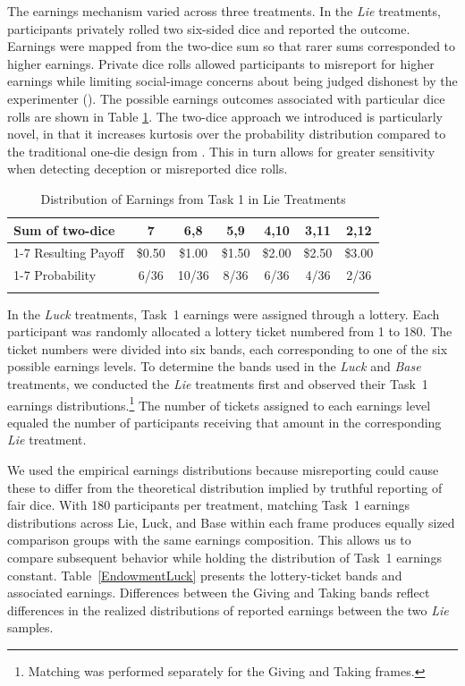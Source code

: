 \documentclass{article}
\begin{document}
The earnings mechanism varied across three treatments. In the \textit{Lie} treatments, participants privately rolled two six-sided dice and reported the outcome. Earnings were mapped from the two-dice sum so that rarer sums corresponded to higher earnings. Private dice rolls allowed participants to misreport for higher earnings while limiting social-image concerns about being judged dishonest by the experimenter (\cite{Fischbacher2013}). The possible earnings outcomes associated with particular dice rolls are shown in Table \ref{EndowmentDie}. The two-dice approach we introduced is particularly novel, in that it increases kurtosis over the probability distribution compared to the traditional one-die design from \textcite{Fischbacher2013}. This in turn allows for greater sensitivity when detecting deception or misreported dice rolls.
\par
\begin{table}[htbp]
    \small
    \centering
    \caption{Distribution of Earnings from Task 1 in Lie Treatments}
        \begin{tabular}{ l  c  c c c c c }
        \toprule \toprule
        Sum of two-dice \phantom{dot}& 7 & 6,8 & 5,9 & 4,10 & 3,11 & 2,12 \\ \cmidrule(lr){1-7}
        Resulting Payoff \phantom{dot}& \$0.50 & \$1.00 & \$1.50 & \$2.00 & \$2.50 & \$3.00 \\ \cmidrule(lr){1-7}
        Probability \phantom{dot}& 6/36 & 10/36 & 8/36 & 6/36 & 4/36 & 2/36 \\
        \bottomrule \bottomrule
        \label{EndowmentDie}
    \end{tabular}
\end{table} 
In the \textit{Luck} treatments, Task~1 earnings were assigned through a lottery. Each participant was randomly allocated a lottery ticket numbered from 1 to 180. The ticket numbers were divided into six bands, each corresponding to one of the six possible earnings levels. To determine the bands used in the \textit{Luck} and \textit{Base} treatments, we conducted the \textit{Lie} treatments first and observed their Task~1 earnings distributions.\footnote{Matching was performed separately for the Giving and Taking frames.} The number of tickets assigned to each earnings level equaled the number of participants receiving that amount in the corresponding \textit{Lie} treatment.
\par
We used the empirical earnings distributions because misreporting could cause these to differ from the theoretical distribution implied by truthful reporting of fair dice. With 180 participants per treatment, matching Task~1 earnings distributions across Lie, Luck, and Base within each frame produces equally sized comparison groups with the same earnings composition. This allows us to compare subsequent behavior while holding the distribution of Task~1 earnings constant. Table~\ref{EndowmentLuck} presents the lottery-ticket bands and associated earnings. Differences between the Giving and Taking bands reflect differences in the realized distributions of reported earnings between the two \textit{Lie} samples.
\end{document}
